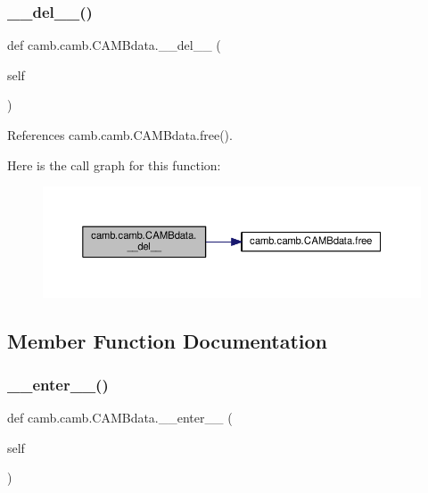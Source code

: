\mbox{\label{classcamb_1_1camb_1_1CAMBdata_aa21844c242620c7c21fc0a5232aa8209}} 
\subsubsection{\texorpdfstring{\+\_\+\+\_\+del\+\_\+\+\_\+()}{\_\_del\_\_()}}
{\footnotesize\ttfamily def camb.\+camb.\+C\+A\+M\+Bdata.\+\_\+\+\_\+del\+\_\+\+\_\+ (\begin{DoxyParamCaption}\item[{}]{self }\end{DoxyParamCaption})}



References camb.\+camb.\+C\+A\+M\+Bdata.\+free().

Here is the call graph for this function\+:
\nopagebreak
\begin{figure}[H]
\begin{center}
\leavevmode
\includegraphics[width=350pt]{classcamb_1_1camb_1_1CAMBdata_aa21844c242620c7c21fc0a5232aa8209_cgraph}
\end{center}
\end{figure}


\subsection{Member Function Documentation}
\mbox{\label{classcamb_1_1camb_1_1CAMBdata_a825b359085f7d722b5466982a7f55e54}} 
\subsubsection{\texorpdfstring{\+\_\+\+\_\+enter\+\_\+\+\_\+()}{\_\_enter\_\_()}}
{\footnotesize\ttfamily def camb.\+camb.\+C\+A\+M\+Bdata.\+\_\+\+\_\+enter\+\_\+\+\_\+ (\begin{DoxyParamCaption}\item[{}]{self }\end{DoxyParamCaption})}

